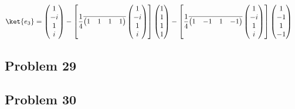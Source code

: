 \documentclass[10pt]{mypackage}
\begin{document}
\begin{align*}
  \ket{e_3} &= \begin{pmatrix}1\\-i\\1\\i\end{pmatrix} - \left[\frac{1}{4} \overline{ \begin{pmatrix}1 & 1 & 1 & 1\end{pmatrix} } \begin{pmatrix}1\\-i\\1\\i\end{pmatrix}\right] \begin{pmatrix}1\\1\\1\\1\end{pmatrix} - \left[\frac{1}{4} \overline{ \begin{pmatrix}1 & -1 & 1 & -1\end{pmatrix} } \begin{pmatrix}1\\-i\\1\\i\end{pmatrix}\right] \begin{pmatrix}1\\-1\\1\\-1\end{pmatrix}
\end{align*}

\subsection{Problem 29}%
\subsection{Problem 30}%
\end{document}

